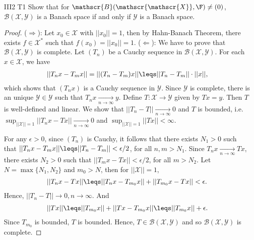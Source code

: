 \begin{exercise}{III2 T1}{}
    Show that for $\mathscr{B}(\mathscr{\mathscr{X}},\F)\neq (0)$,
    $\mathscr{B}(\mathscr{\mathscr{X}},\mathscr{\mathscr{Y}})$ is a Banach space 
    if and only if $\mathscr{\mathscr{Y}}$ is a Banach space.
\end{exercise}
\begin{proof}
    ($\Rightarrow$):
        Let $x_0\in \mathscr{X}$ with $||x_0||=1$,
        then by Hahn-Banach Theorem, there exists $f\in\mathscr{X}^*$ such that $f(x_0)=||x_0||=1$.
    ($\Leftarrow$):
    We have to prove that $\mathscr{B}(\mathscr{X},\mathscr{Y})$ is complete.
    Let $(T_n)$ be a Cauchy sequence in $\mathscr{B}(\mathscr{\mathscr{X}},\mathscr{\mathscr{Y}})$.
    For each $x\in\mathscr{\mathscr{X}}$, we have
    \begin{align*}
        ||T_nx-T_mx||=||(T_n-T_m)x||\leqs ||T_n-T_m||\cdot ||x||,
    \end{align*}
    which shows that $(T_nx)$ is a Cauchy sequence in $\mathscr{Y}$.
    Since $\mathscr{Y}$ is complete, there is an unique $\mathscr{Y}\in \mathscr{Y}$ such that $T_nx\underset{n\rightarrow \infty}{\longrightarrow}y$.
    Define $T:\mathscr{X}\rightarrow \mathscr{Y}$ given by $Tx=y$. Then $T$ is well-defined and linear.
    We show that $||T_n-T||\underset{n\rightarrow \infty}{\longrightarrow} 0$ and $T$ is bounded,
    i.e. $\sup_{||\mathscr{X}||=1}||T_nx-Tx||\underset{n\rightarrow \infty}{\longrightarrow} 0$
    and $\sup_{||\mathscr{X}||=1}||Tx||<\infty$.
    
    For any $\epsilon>0$, since $(T_n)$ is Cauchy, 
    it follows that there exists $N_1>0$ such that 
    $||T_nx-T_mx||\leqs ||T_n-T_m||<\epsilon/2$, for all $n,m>N_1$.
    Since $T_nx\underset{n\rightarrow \infty}{\longrightarrow} Tx$, 
    there exists $N_2>0$ such that $||T_mx-Tx||<\epsilon/2$, for all $m>N_2$.
    Let $N=\max\{N_1,N_2\}$ and $m_0>N$, then for $||\mathscr{X}||=1$,
    \begin{align*}
        ||T_nx-Tx||\leqs ||T_nx-T_{m_0}x||+||T_{m_0}x-Tx||<\epsilon.
    \end{align*}
    Hence, $||T_n-T||\rightarrow 0, n\rightarrow \infty$. And
    \begin{align*}
        ||Tx||\leqs ||T_{m_0}x||+||Tx-T_{m_0}x||\leqs ||T_{m_0}x||+\epsilon.
    \end{align*}
    Since $T_{m_0}$ is bounded, $T$ is bounded. Hence, $T\in \mathscr{B}(\mathscr{\mathscr{X}},\mathscr{\mathscr{Y}})$ and so $\mathscr{B}(\mathscr{\mathscr{X}},\mathscr{\mathscr{Y}})$ is complete.
\end{proof}

